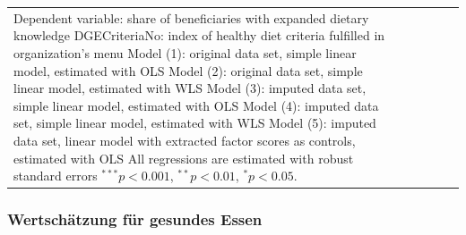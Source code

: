\begin{frame}[fragile]
\begin{itemize}
\begin{frame}
\begin{table}
\begin{center}
{\begin{tabular}{l c c c c c }
{{{\vspace{2pt} Dependent variable: share of beneficiaries with expanded dietary knowledge \\ DGECriteriaNo: index of healthy diet criteria fulfilled in organization's menu \\ Model (1): original data set, simple linear model, estimated with OLS \\ Model (2): original data set, simple linear model, estimated with WLS \\ Model (3): imputed data set, simple linear model, estimated with OLS \\ Model (4): imputed data set, simple linear model, estimated with WLS \\ Model (5): imputed data set, linear model with extracted factor scores as controls, estimated with OLS \\ All regressions are estimated with robust standard errors $^{***}p<0.001$, $^{**}p<0.01$, $^*p<0.05$.}}}
\end{tabular}
}
\label{HealthRegressions-DietaryKnowledge}
\end{center}
\end{table}

\end{frame}

\begin{frame}[fragile]
\frametitle{Wertschätzung für gesundes Essen}


\end{frame}
\end{itemize}
\end{frame}
